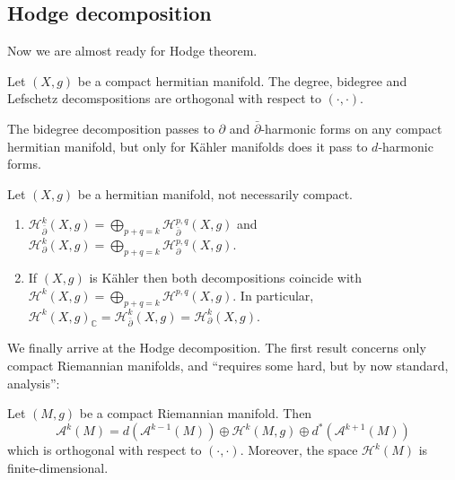 \subsection{Hodge decomposition}
\label{subsection-hodge-decomposition}

\medskip\noindent
Now we are almost ready for Hodge theorem.

\begin{proposition}
\label{proposition-decom-ortho}
\begin{reference}
\cite[Proposition 3.2.2]{huc}
\end{reference}
Let $(X,g)$ be a compact hermitian manifold.
The degree, bidegree and Lefschetz
decomspositions
are orthogonal with respect to
$(\cdot,\cdot)$.
\end{proposition}

\noindent
The bidegree decomposition passes to
$\partial$ and $\bar\partial$-harmonic forms
on any compact hermitian manifold,
but only for Kähler manifolds does it pass to
$d$-harmonic forms.

\begin{proposition}
\label{proposition-decom-harmo-forms}
Let $(X,g)$ be a hermitian manifold, not
necessarily compact.
\begin{enumerate}
\item $\mathcal{H}^{k}_{\bar\partial}(X,g)
=\bigoplus_{p+q=k}\mathcal{H}^{p,q}
_{\bar\partial}(X,g)$
and
$\mathcal{H}^{k}_\partial(X,g)
=\bigoplus_{p+q=k}\mathcal{H}^{p,q}
_\partial(X,g)$.

\item If $(X,g)$ is Kähler then both
decompositions coincide with
$\mathcal{H}^{k}(X,g)
=\bigoplus_{p+q=k}\mathcal{H}^{p,q}(X,g)$.
In particular,
$\mathcal{H}^k(X,g)_{\mathbb{C}}
=\mathcal{H}^k_{\bar\partial}(X,g)
=\mathcal{H}^k_{\partial}(X,g)$.
\end{enumerate}
\end{proposition}

\noindent
We finally arrive at the Hodge decomposition.
The first result concerns only compact
Riemannian manifolds,
and ``requires some hard, but by now
standard, analysis'':

\begin{theorem}
\label{theorem-hodge-decomposition}
Let $(M,g)$ be a compact Riemannian manifold.
Then
$$
\mathcal{A}^k(M) =
d(\mathcal{A}^{k-1}(M))
\oplus
\mathcal{H}^k(M,g)
\oplus
d^* (\mathcal{A}^{k+1}(M))
$$
which is orthogonal with respect to
$(\cdot,\cdot)$.
Moreover, the space $\mathcal{H}^k(M)$ is
finite-dimensional.
\end{theorem}

